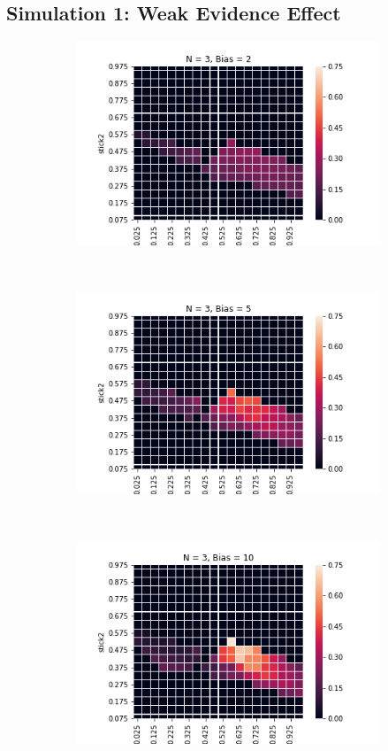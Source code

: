 \documentclass[10pt,letterpaper]{article}
\begin{document}
\subsection{Simulation 1: Weak Evidence Effect}
\begin{figure}[h]
\centering
\begin{subfigure}{0.3\linewidth}
	\includegraphics[width=\linewidth]{figures/nSticks3bias2.png}
\end{subfigure}
~
\begin{subfigure}{0.3\linewidth}
	\includegraphics[width=\linewidth]{figures/nSticks3bias5.png}
\end{subfigure}
~
\begin{subfigure}{0.3\linewidth}
	\includegraphics[width=\linewidth]{figures/nSticks3bias10.png}

\end{subfigure}
\end{figure}
\end{document}
